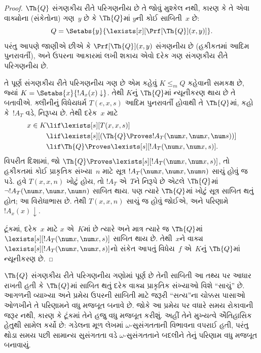 \begin{proof}
$\Th{Q}$ સંગણકીય રીતે પરિગણનીય છે
તે જોવું મુશ્કેલ નથી, કારણ કે
તે એવા વાક્યોના (સંકેતોના)
ગણ~$y$ છે કે $\Th{Q}$માં
$y$ની કોઈ સાબિતી~$x$ છે:
\[
Q = \Setabs{y}{\lexists[x][\Prf[\Th{Q}](x,y)]}.
\]
પરંતુ આપણે જાણીએ છીએ કે
$\Prf[\Th{Q}](x,y)$ સંગણનીય
છે (હકીકતમાં આદિમ પુનરાવર્તી),
અને ઉપરના આકારમાં લખી શકાય
એવો દરેક ગણ સંગણકીય રીતે
પરિગણનીય છે.

તે પૂર્ણ સંગણકીય રીતે
પરિગણનીય ગણ છે એમ કહેવું
$K \leq_m Q$ કહેવાની સમકક્ષ
છે, જ્યાં $K = \Setabs{x}{!A_x(x) \downarrow}$.
તેથી $K$નું $\Th{Q}$માં
ન્યૂનીકરણ થાય છે તે બતાવીએ.
ક્લીનીનું વિધેયધર્મ
$T(e,x,s)$ આદિમ પુનરાવર્તી
હોવાથી તે $\Th{Q}$માં,
કહો કે~$!A_T$ વડે, નિરૂપ્ય
છે. તેથી દરેક~$x$ માટે
\begin{align*}
x \in K & \lif \lexists[s][T(x,x,s)] \\
& \lif \lexists[s][(\Th{Q} \Proves !A_T(\num x,\num x, \num s))]
  \\
& \lif \Th{Q} \Proves \lexists[s][!A_T(\num x, \num x, s)].
\end{align*}
વિપરીત દિશામાં, જો
$\Th{Q} \Proves \lexists[s][!A_T(\num x, \num x, s)]$,
તો હકીકતમાં કોઈ પ્રાકૃતિક
સંખ્યા~$n$ માટે સૂત્ર
$!A_T(\num x, \num x, \num n)$
સાચું હોવું જ પડે. હવે
$T(x,x,n)$ ખોટું હોય, તો
$!A_T$ એ~$T$ને નિરૂપે છે
એટલે $\Th{Q}$માં
$\lnot !A_T(\num x, \num x, \num n)$
સાબિત થાય. પણ ત્યારે
$\Th{Q}$માં ખોટું સૂત્ર
સાબિત થતું હોત; આ
વિરોધાભાસ છે. તેથી
$T(x,x,n)$ સાચું જ હોવું
જોઈએ, અને પરિણામે
$!A_x(x) \downarrow$.

ટૂંકમાં, દરેક~$x$ માટે
$x$ એ~$K$માં છે ત્યારે અને
માત્ર ત્યારે જ $\Th{Q}$માં
$\lexists[s][!A_T(\num x,\num x,s)]$
સાબિત થાય છે. તેથી~$x$ને
વાક્ય $\lexists[s][!A_T(\num x,
  \num x, s)]$નો સંકેત આપતું
વિધેય~$f$ એ~$K$નું
$\Th{Q}$માં ન્યૂનીકરણ છે.
\end{proof}
\endgroup


\begingroup
\makeatletter{}\makeatother


\label{guunit:OLP-0304}


\begin{explain}
$\Th{Q}$ સંગણકીય રીતે
પરિગણનીય ગણોમાં પૂર્ણ છે
તેની સાબિતી આ તથ્ય પર
આધાર રાખતી હતી કે
$\Th{Q}$માં સાબિત થતું
દરેક વાક્ય પ્રાકૃતિક
સંખ્યાઓ વિશે ``સાચું'' છે.
આગળની વ્યાખ્યા અને પ્રમેય
ઉપરની સાબિતી માટે જરૂરી
``સત્ય''ના ચોક્કસ પાસાઓ
ઓળખીને તે પરિણામને વધુ
મજબૂત બનાવે છે. જોકે આ
પ્રમેય પર વધારે સમય રોકાવાની
જરૂર નથી, કારણ કે ટૂંકમાં
તેને હજુ વધુ મજબૂત કરીશું.
અહીં તેને મુખ્યત્વે ઐતિહાસિક
હેતુથી સામેલ કર્યો છે:
ગડેલના મૂળ લેખમાં
$\omega$-સુસંગતતાની
વિભાવના વપરાઈ હતી, પરંતુ
થોડા સમય પછી સામાન્ય
સુસંગતતા વડે
$\omega$-સુસંગતતાને
બદલીને તેનું પરિણામ વધુ
મજબૂત બનાવાયું.
\end{explain}

